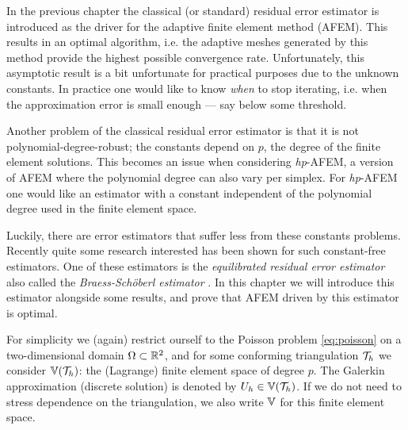 \documentclass[thesis.tex]{subfiles}
\begin{document}
In the previous chapter the classical (or standard) residual error estimator is introduced as the driver for the
adaptive finite element method (AFEM). This results in an optimal algorithm, i.e. the adaptive meshes
generated by this method provide the highest possible convergence rate. Unfortunately, this asymptotic result
is a bit unfortunate for practical purposes due to the unknown constants. In practice
one would like to know \emph{when} to stop iterating, i.e. when the approximation error is small enough --- say
below some threshold. 

Another problem of the classical residual error estimator is that it is not polynomial-degree-robust; 
the constants depend on $p$, the degree of the finite element solutions. This becomes an issue
when considering \emph{hp}-AFEM, a version of AFEM where the polynomial degree can also vary
per simplex. For \emph{hp}-AFEM one would like an estimator with a constant independent of the polynomial degree
used in the finite element space.

Luckily, there are error estimators that suffer less from these constants problems. Recently quite
some research interested has been shown for such constant-free estimators. One of these estimators is the
\emph{equilibrated residual error estimator} also called the \emph{Braess-Sch\"oberl estimator} \cite{braessequil, braessequilrobust,ernequil}.
In this chapter we will introduce this estimator alongside some results, and prove that AFEM driven 
by this estimator is optimal.

For simplicity we (again) restrict ourself to the Poisson problem \eqref{eq:poisson} on a two-dimensional domain $\Omega \subset \mathbb{R}^2$,
and for some conforming triangulation $\mathcal{T}_h$ we consider $\mathbb{V}(\mathcal{T}_h)$: the (Lagrange) finite element space of degree $p$. 
The Galerkin approximation (discrete solution) is denoted by $U_h \in \mathbb{V}(\mathcal{T}_h)$.
If we do not need to stress dependence on the triangulation, we also write $\mathbb{V}$ for this finite element space.
\end{document}
